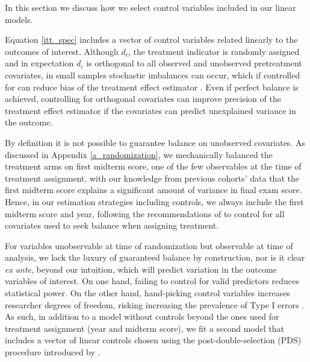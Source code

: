 \documentclass[12pt]{article}
\begin{document}
In this section we discuss how we select control variables included in our linear models.

Equation \ref{itt_spec} includes a vector of control variables related linearly to the outcomes of interest. Although $d_i$, the treatment indicator is randomly assigned and in expectation $d_i$ is orthogonal to all observed and unobserved pretreatment covariates, in small samples stochastic imbalances can occur, which if controlled for can reduce bias of the treatment effect estimator \parencite{ai2017}. Even if perfect balance is achieved, controlling for orthogonal covariates can improve precision of the treatment effect estimator if the covariates can predict unexplained variance in the outcome.

By definition it is not possible to guarantee balance on unobserved covariates. As discussed in Appendix \ref{a_randomization}, we mechanically balanced the treatment arms on first midterm score, one of the few observables at the time of treatment assignment, with our knowledge from previous cohorts' data that the first midterm score explains a significant amount of variance in final exam score. Hence, in our estimation strategies including controls, we always include the first midterm score and year, following the recommendations of \textcite{bm2009} to control for all covariates used to seek balance when assigning treatment.

For variables unobservable at time of randomization but observable at time of analysis, we lack the luxury of guaranteed balance by construction, nor is it clear \textit{ex ante}, beyond our intuition, which will predict variation in the outcome variables of interest. On one hand, failing to control for valid predictors reduces statistical power. On the other hand, hand-picking control variables increases researcher degrees of freedom, risking increasing the prevalence of Type I errors \parencite{sns2011}. As such, in addition to a model without controls beyond the ones used for treatment assignment (year and midterm score), we fit a second model that includes a vector of linear controls chosen using the post-double-selection (PDS) procedure introduced by \textcite{bch2014a}.
\end{document}
